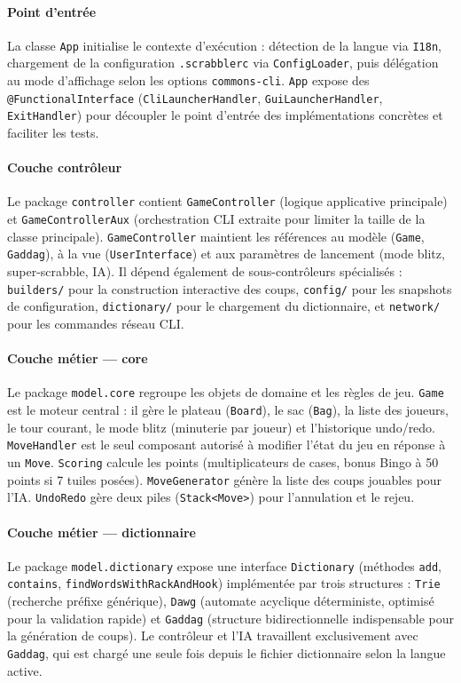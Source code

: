 \documentclass[a4paper]{article}
\begin{document}
\paragraph{Point d'entrée}
La classe \texttt{App} initialise le contexte d'exécution : détection de la langue via \texttt{I18n}, chargement de la configuration \texttt{.scrabblerc} via \texttt{ConfigLoader}, puis délégation au mode d'affichage selon les options \texttt{commons-cli}. \texttt{App} expose des \texttt{@FunctionalInterface} (\texttt{CliLauncherHandler}, \texttt{GuiLauncherHandler}, \texttt{ExitHandler}) pour découpler le point d'entrée des implémentations concrètes et faciliter les tests.

\paragraph{Couche contrôleur}
Le package \texttt{controller} contient \texttt{GameController} (logique applicative principale) et \texttt{GameControllerAux} (orchestration CLI extraite pour limiter la taille de la classe principale). \texttt{GameController} maintient les références au modèle (\texttt{Game}, \texttt{Gaddag}), à la vue (\texttt{UserInterface}) et aux paramètres de lancement (mode blitz, super-scrabble, IA). Il dépend également de sous-contrôleurs spécialisés : \texttt{builders/} pour la construction interactive des coups, \texttt{config/} pour les snapshots de configuration, \texttt{dictionary/} pour le chargement du dictionnaire, et \texttt{network/} pour les commandes réseau CLI.

\paragraph{Couche métier --- core}
Le package \texttt{model.core} regroupe les objets de domaine et les règles de jeu. \texttt{Game} est le moteur central : il gère le plateau (\texttt{Board}), le sac (\texttt{Bag}), la liste des joueurs, le tour courant, le mode blitz (minuterie par joueur) et l'historique undo/redo. \texttt{MoveHandler} est le seul composant autorisé à modifier l'état du jeu en réponse à un \texttt{Move}. \texttt{Scoring} calcule les points (multiplicateurs de cases, bonus Bingo à 50 points si 7 tuiles posées). \texttt{MoveGenerator} génère la liste des coups jouables pour l'IA. \texttt{UndoRedo} gère deux piles (\texttt{Stack<Move>}) pour l'annulation et le rejeu.

\paragraph{Couche métier --- dictionnaire}
Le package \texttt{model.dictionary} expose une interface \texttt{Dictionary} (méthodes \texttt{add}, \texttt{contains}, \texttt{findWordsWithRackAndHook}) implémentée par trois structures : \texttt{Trie} (recherche préfixe générique), \texttt{Dawg} (automate acyclique déterministe, optimisé pour la validation rapide) et \texttt{Gaddag} (structure bidirectionnelle indispensable pour la génération de coups). Le contrôleur et l'IA travaillent exclusivement avec \texttt{Gaddag}, qui est chargé une seule fois depuis le fichier dictionnaire selon la langue active.
\end{document}
